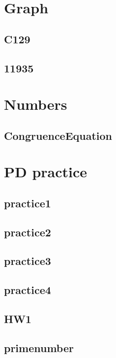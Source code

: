 

\section{Graph}
    \subsection{C129}
        
    \subsection{11935}
        

\section{Numbers}
    \subsection{CongruenceEquation}
        

\section{PD practice}
    \subsection{practice1}
        
    \subsection{practice2}
        
    \subsection{practice3}
        
    \subsection{practice4}
        
    \subsection{HW1}
        
    \subsection{primenumber}
        
        